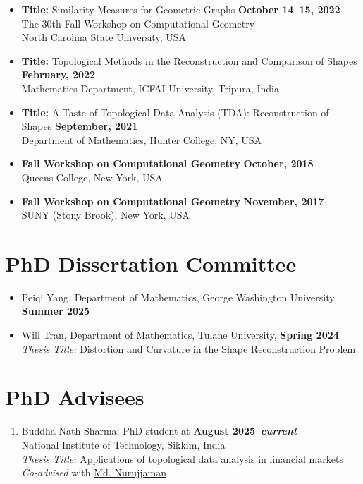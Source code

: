 \documentclass[11pt]{article}
\begin{document}
\begin{itemize}[leftmargin=*]
  \item \textbf{Title:} Similarity Measures for Geometric Graphs
  \hfill  \textbf{\footnotesize October 14--15, 2022} \\
  The 30th Fall Workshop on Computational Geometry\\North Carolina State University, USA

\item \textbf{Title:} Topological Methods in the Reconstruction and Comparison
of Shapes \hfill  \textbf{\footnotesize February, 2022} \\
  Mathematics Department, ICFAI University, Tripura, India

  \item \textbf{Title:} A Taste of Topological Data Analysis (TDA): Reconstruction of Shapes
  \hfill  \textbf{\footnotesize September, 2021} \\
  Department of Mathematics, Hunter College, NY, USA

  \item \textbf{Fall Workshop on Computational Geometry}
  \hfill \textbf{\footnotesize October, 2018} \\
  Queens College, New York, USA

\item \textbf{Fall Workshop on Computational Geometry}
  \hfill \textbf{\footnotesize November, 2017}\\
  SUNY (Stony Brook), New York, USA
\end{itemize}

\section{PhD Dissertation Committee}
\begin{itemize}
  \item Peiqi Yang, Department of Mathematics, George Washington University \hfill\textbf{\footnotesize Summer 2025}

  \item Will Tran, Department of Mathematics, Tulane University, \hfill\textbf{\footnotesize Spring 2024}\\
  \emph{Thesis Title:} Distortion and Curvature in the Shape Reconstruction Problem
\end{itemize}

\section{PhD Advisees}
\begin{enumerate}
\item Buddha Nath Sharma, PhD student at \hfill\textbf{\footnotesize August 2025--\emph{current}}\\ 
National Institute of Technology, Sikkim, India \\
\emph{Thesis Title:} Applications of topological data analysis in financial markets\\
\emph{Co-advised} with \href{https://physics.nitsikkim.ac.in/profile.php?sn=23}{Md. Nurujjaman}
\end{enumerate}
\end{document}

